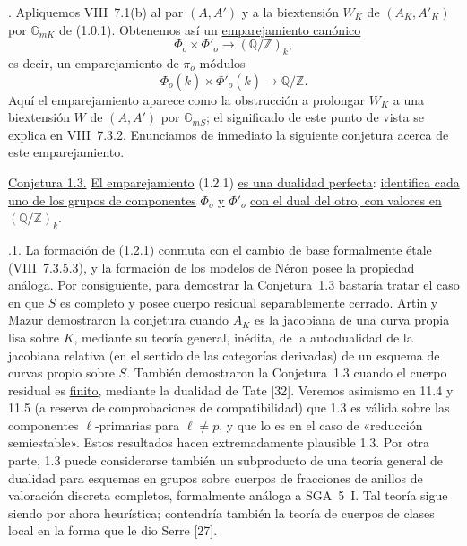 \par\medskip
{}. Apliquemos VIII~7.1(b) al par $(A,A')$ y a la biextensión
$W_K$ de $(A_K,A'_K)$ por $\mathbb G_{mK}$ de (1.0.1). Obtenemos así
un \underline{emparejamiento canónico}
\begin{equation}\tag{1.2.1}
 \Phi_o\times\Phi'_o\longrightarrow(\mathbb Q/\mathbb Z)_k,
\end{equation}
es decir, un emparejamiento de $\pi_o$-módulos
\begin{equation}\tag{1.2.2}
 \Phi_o(\overline k)\times\Phi'_o(\overline k)
 \longrightarrow\mathbb Q/\mathbb Z.
\end{equation}
Aquí el emparejamiento aparece como la obstrucción a prolongar $W_K$
a una biextensión $W$ de $(A,A')$ por $\mathbb G_{mS}$; el significado
de este punto de vista se explica en VIII~7.3.2. Enunciamos de inmediato
la siguiente conjetura acerca de este emparejamiento.

\medskip
\noindent
\underline{Conjetura 1.3.} \underline{El emparejamiento} (1.2.1)
\underline{es una dualidad perfecta}: \underline{identifica cada uno de
los grupos de componentes} $\Phi_o$ \underline{y} $\Phi'_o$
\underline{con el dual del otro, con valores en}
$(\mathbb Q/\mathbb Z)_k$.

\medskip
{}.1. La formación de (1.2.1) conmuta con el cambio de base
formalmente étale (VIII~7.3.5.3), y la formación de los modelos de
Néron posee la propiedad análoga. Por consiguiente, para demostrar la
Conjetura~1.3 bastaría tratar el caso en que $S$ es completo y posee
cuerpo residual separablemente cerrado. Artin y Mazur demostraron la
conjetura cuando $A_K$ es la jacobiana de una curva propia lisa sobre
$K$, mediante su teoría general, inédita, de la autodualidad de la
jacobiana relativa (en el sentido de las categorías derivadas) de un
esquema de curvas propio sobre $S$. También demostraron la Conjetura~1.3
cuando el cuerpo residual es \underline{finito}, mediante la dualidad
de Tate [32]. Veremos asimismo en 11.4 y 11.5 (a reserva de comprobaciones
de compatibilidad) que 1.3 es válida sobre las componentes
$\ell$-primarias
para $\ell\ne p$, y que lo es en el caso de «reducción semiestable».
Estos resultados hacen extremadamente plausible 1.3. Por otra parte,
1.3 puede considerarse también un subproducto de una teoría general de
dualidad para esquemas en grupos sobre cuerpos de fracciones de anillos
de valoración discreta completos, formalmente análoga a SGA~5~I. Tal
teoría sigue siendo por ahora heurística; contendría también la teoría
de cuerpos de clases local en la forma que le dio Serre [27].

